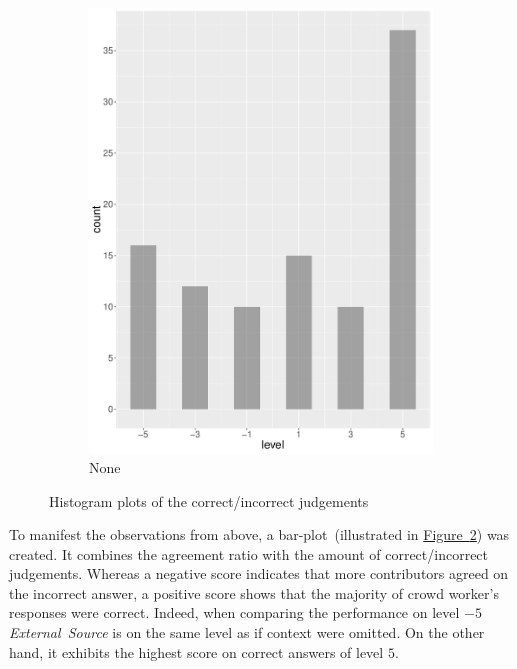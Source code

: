 \begin{figure}
\begin{subfigure}[b]{0.4\textwidth}
        \includegraphics[width=\textwidth]{plots/climate_change/hist_level_none}
        \caption{None}
        \label{fig:hist_level_climate_change_none}
    \end{subfigure}
    \caption{Histogram plots of the correct/incorrect judgements}\label{fig:hist_level_climate_change_all}
\end{figure}

To manifest the observations from above, a bar-plot~(illustrated in \hyperref[fig:hist_level_climate_change_all]{Figure~\ref*{fig:hist_level_climate_change_all}}) was created. It combines the agreement ratio with the amount of correct/incorrect judgements. Whereas a negative score indicates that more contributors agreed on the incorrect answer, a positive score shows that the majority of crowd worker's responses were correct. Indeed, when comparing the performance on level $-5$ \emph{External~Source} is on the same level as if context were omitted. On the other hand, it exhibits the highest score on correct answers of level $5$.

